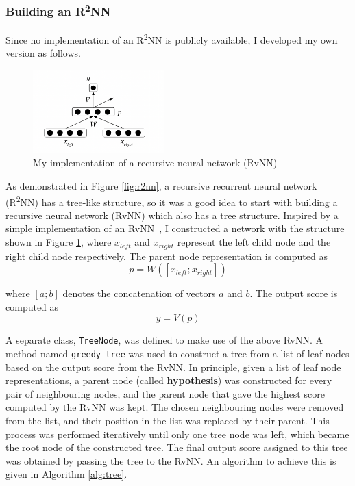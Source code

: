 \documentclass[12pt,a4paper,twoside]{report}
\begin{document}
\subsubsection{Building an \texorpdfstring{R\textsuperscript{2}NN}{R2NN}}
Since no implementation of an R\textsuperscript{2}NN is publicly available, I developed my own version as follows.

\begin{figure}[ht]
\centering
\includegraphics[width=0.45\textwidth]{images/rvnn_imple.png}
\caption{My implementation of a recursive neural network (RvNN)}
\label{fig:rvnn_imple}
\end{figure}

As demonstrated in Figure \ref{fig:r2nn}, a recursive recurrent neural network (R\textsuperscript{2}NN) has a tree-like structure, so it was a good idea to start with building a recursive neural network (RvNN) which also has a tree structure. Inspired by a simple implementation of an RvNN~\cite{rvnn_daniel}, I constructed a network with the structure shown in Figure \ref{fig:rvnn_imple}, where $x_{left}$ and $x_{right}$ represent the left child node and the right child node respectively. The parent node representation is computed as
\[p = W([x_{left}; x_{right}])\]

where $[a;b]$ denotes the concatenation of vectors $a$ and $b$. The output score is computed as
\[y = V(p)\]

A separate class, \texttt{TreeNode}, was defined to make use of the above RvNN. A method named \texttt{greedy\_tree} was used to construct a tree from a list of leaf nodes based on the output score from the RvNN. In principle, given a list of leaf node representations, a parent node (called \textbf{hypothesis}) was constructed for every pair of neighbouring nodes, and the parent node that gave the highest score computed by the RvNN was kept. The chosen neighbouring nodes were removed from the list, and their position in the list was replaced by their parent. This process was performed iteratively until only one tree node was left, which became the root node of the constructed tree. The final output score assigned to this tree was obtained by passing the tree to the RvNN. An algorithm to achieve this is given in Algorithm \ref{alg:tree}.
\end{document}
